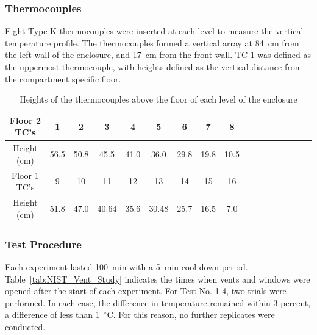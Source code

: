 \subsubsection{Thermocouples}

Eight Type-K thermocouples were inserted at each level to measure the vertical temperature profile. The thermocouples formed a vertical array at 84~cm from the left wall of the enclosure, and 17~cm from the front wall. TC-1 was defined as the uppermost thermocouple, with heights defined as the vertical distance from the compartment specific floor.

\begin{table}[h!]
\caption{Heights of the thermocouples above the floor of each level of the enclosure}
\begin{center}
\begin{tabular}{|c|c|c|c|c|c|c|c|c|c|c|c|c|c|c|c|c|}
\hline
Floor 2 TC's   & 1& 2& 3 & 4& 5& 6& 7&8\\ \hline
Height (cm) & 56.5& 50.8& 45.5& 41.0& 36.0& 29.8& 19.8& 10.5\\ \hline
Floor 1 TC's & 9&10&11&12&13&14&15&16\\ \hline
Height (cm) &51.8&47.0&40.64&35.6&30.48&25.7& 16.5&7.0\\ \hline


\end{tabular}
\end{center}
\label{Tab.TC}
\end{table}

\subsubsection{Test Procedure}

Each experiment lasted 100~min with a 5~min cool down period. Table~\ref{tab:NIST_Vent_Study} indicates the times when vents and windows were opened after the start of each experiment. For Test No. 1-4, two trials were performed. In each case, the difference in temperature remained within 3 percent, a difference of less than 1~$^\circ$C. For this reason, no further replicates were conducted.

